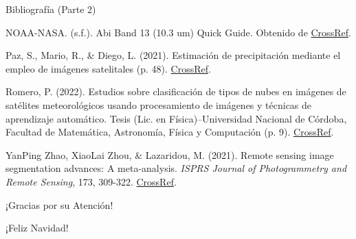 \documentclass[aspectratio=169,xcolor=dvipsnames]{beamer}
\begin{document}
\begin{frame}{Bibliografía (Parte 2)}
    \footnotesize{
        \begin{thebibliography}{99}
             NOAA-NASA. (s.f.). Abi Band 13 (10.3 um) Quick Guide. Obtenido de \href{http://cimss.ssec.wisc.edu/goes/OCLOFactSheetPDFs/ABIQuickGuide_Band13.pdf}{CrossRef}.
            
             Paz, S., Mario, R., \& Diego, L. (2021). Estimación de precipitación mediante el empleo de imágenes satelitales (p. 48). \href{https://hdl.handle.net/20.500.12542/1470}{CrossRef}.
            
             Romero, P. (2022). Estudios sobre clasificación de tipos de nubes en imágenes de satélites meteorológicos usando procesamiento de imágenes y técnicas de aprendizaje automático. Tesis (Lic. en Física)--Universidad Nacional de Córdoba, Facultad de Matemática, Astronomía, Física y Computación (p. 9). \href{http://hdl.handle.net/11086/24824}{CrossRef}.
            
             YanPing Zhao, XiaoLai Zhou, \& Lazaridou, M. (2021). Remote sensing image segmentation advances: A meta-analysis. \emph{ISPRS Journal of Photogrammetry and Remote Sensing}, 173, 309-322. \href{https://doi.org/10.1016/j.isprsjprs.2021.01.020}{CrossRef}.
        \end{thebibliography}
    }
\end{frame}

\begin{frame}
    \Huge{\centerline{¡Gracias por su Atención!}}
    \Huge{\centerline{¡Feliz Navidad!}}
\end{frame}
\end{document}
